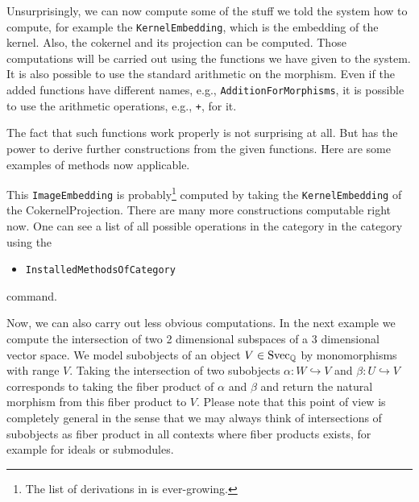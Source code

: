 \begin{small}

\end{small}

Unsurprisingly, we can now compute some of the stuff we told the system how to compute, for example the \texttt{KernelEmbedding},
which is the embedding of the kernel. Also, the cokernel and its projection can be computed. Those computations will
be carried out using the functions we have given to the system. It is also possible to use the standard arithmetic on the morphism.
Even if the added functions have different names, e.g., \texttt{AdditionForMorphisms}, it is possible to use the \GAP arithmetic
operations, e.g., \texttt{+}, for it.

\begin{small}

\end{small}

The fact that such functions work properly is not surprising at all. But \CapPkg has the power to derive
further constructions from the given functions. Here are some examples of methods now applicable.

\begin{small}

\end{small}

This \texttt{ImageEmbedding} is probably\footnote{The list of derivations in \CapPkg is ever-growing.} computed by taking the \texttt{KernelEmbedding} of the \textrm{CokernelProjection}.
There are many more constructions computable right now. One can see a list of all possible operations in the category
in the category using the 
\begin{itemize}
  \item \texttt{InstalledMethodsOfCategory}
\end{itemize}
command.

\begin{small}

\end{small}

Now, we can also carry out less obvious computations. In the next example we compute the intersection of two 2 dimensional
subspaces of a 3 dimensional vector space.
We model subobjects of an object $V \in \mathrm{Svec}_{\mathbb{Q}}$ by monomorphisms with range $V$.
Taking the intersection of two subobjects 
$\alpha: W \hookrightarrow V$ and $\beta: U \hookrightarrow V$
corresponds to taking the fiber product of $\alpha$ and $\beta$ and return the natural morphism from this fiber product to $V$.
Please note that this point of view is completely general in the sense that we may always think of intersections of
subobjects as fiber product in all contexts where fiber products exists, for example for ideals or submodules.

